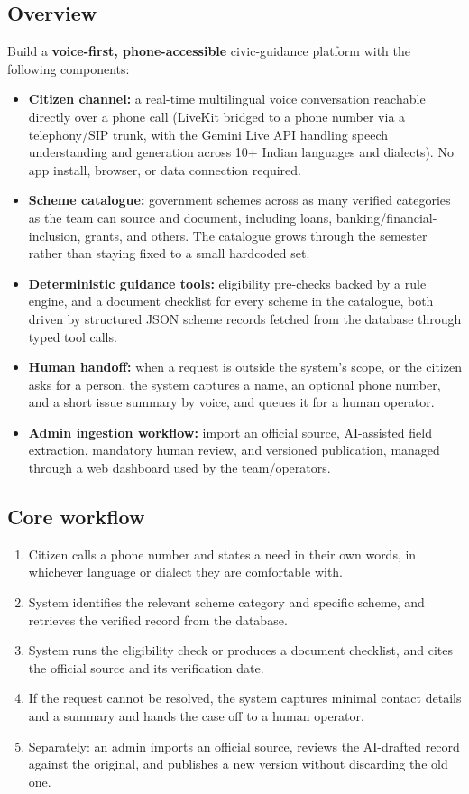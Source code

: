\documentclass[11pt,a4paper]{article}
\begin{document}
\subsection{Overview}
Build a \textbf{voice-first, phone-accessible} civic-guidance platform with the following components:
\begin{itemize}[leftmargin=0.7cm]
    \item \textbf{Citizen channel:} a real-time multilingual voice conversation reachable directly over a phone call (LiveKit bridged to a phone number via a telephony/SIP trunk, with the Gemini Live API handling speech understanding and generation across 10+ Indian languages and dialects). No app install, browser, or data connection required.
    \item \textbf{Scheme catalogue:} government schemes across as many verified categories as the team can source and document, including loans, banking/financial-inclusion, grants, and others. The catalogue grows through the semester rather than staying fixed to a small hardcoded set.
    \item \textbf{Deterministic guidance tools:} eligibility pre-checks backed by a rule engine, and a document checklist for every scheme in the catalogue, both driven by structured JSON scheme records fetched from the database through typed tool calls.
    \item \textbf{Human handoff:} when a request is outside the system's scope, or the citizen asks for a person, the system captures a name, an optional phone number, and a short issue summary by voice, and queues it for a human operator.
    \item \textbf{Admin ingestion workflow:} import an official source, AI-assisted field extraction, mandatory human review, and versioned publication, managed through a web dashboard used by the team/operators.
\end{itemize}

\subsection{Core workflow}
\begin{enumerate}[leftmargin=0.7cm]
    \item Citizen calls a phone number and states a need in their own words, in whichever language or dialect they are comfortable with.
    \item System identifies the relevant scheme category and specific scheme, and retrieves the verified record from the database.
    \item System runs the eligibility check or produces a document checklist, and cites the official source and its verification date.
    \item If the request cannot be resolved, the system captures minimal contact details and a summary and hands the case off to a human operator.
    \item Separately: an admin imports an official source, reviews the AI-drafted record against the original, and publishes a new version without discarding the old one.
\end{enumerate}
\end{document}
